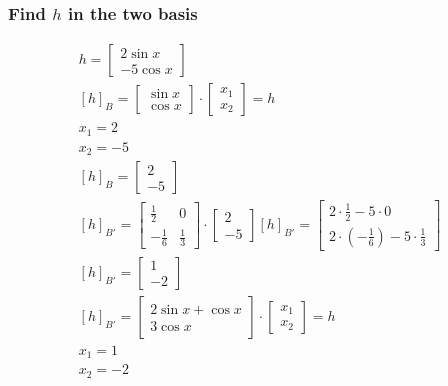 \documentclass[12pt, a4paper]{article}
\begin{document}
			\subsubsection{Find $h$ in the two basis}
				\begin{align*}
					h=\begin{bmatrix}2\sin x \\- 5\cos x\end{bmatrix}\\
					[h]_B=\begin{bmatrix}\sin x\\\cos x\end{bmatrix}\cdot \begin{bmatrix}x_1\\x_2\end{bmatrix}=h\\
					x_1=2\\
					x_2=-5\\
					[h]_B=\begin{bmatrix}2\\-5\end{bmatrix}\\
					[h]_{B'}=\begin{bmatrix}\frac{1}{2} & 0\\ -\frac{1}{6} & \frac{1}{3}\end{bmatrix}\cdot \begin{bmatrix}2\\-5\end{bmatrix}
					[h]_{B'}=\begin{bmatrix}2\cdot \frac{1}{2}-5\cdot 0\\2\cdot (-\frac{1}{6})-5\cdot \frac{1}{3}\end{bmatrix}\\
					[h]_{B'}=\begin{bmatrix}1\\-2\end{bmatrix}\\[4mm]
					[h]_{B'}=\begin{bmatrix}2\sin x + \cos x\\3\cos x\end{bmatrix}\cdot \begin{bmatrix}x_1\\x_2\end{bmatrix}=h\\
					x_1=1\\
					x_2=-2
				\end{align*}
\end{document}
